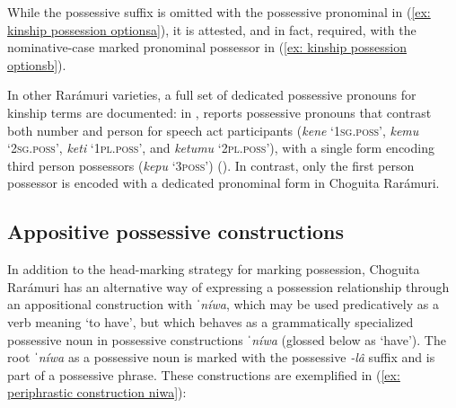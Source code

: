     \label{ex: kinship possession optionsa}
        \label{ex: kinship possession optionsb}
    \z
\z

While the possessive suffix is omitted with the possessive pronominal in (\ref{ex: kinship possession optionsa}), it is attested, and in fact, required, with the nominative-case marked pronominal possessor in (\ref{ex: kinship possession optionsb}).

In other Rarámuri varieties, a full set of dedicated possessive pronouns for kinship terms are documented: in , \citet{brambila1976diccionario} reports possessive pronouns that contrast both number and person for speech act participants (\textit{kene} `1\textsc{sg.poss}', \textit{kemu} `2\textsc{sg.poss}', \textit{keti} `1\textsc{pl.poss}', and \textit{ketumu} `2\textsc{pl.poss}'), with a single form encoding third person possessors (\textit{kepu} `3\textsc{poss}') (\citeyear[246--248]{brambila1976diccionario}). In contrast, only the first person possessor is encoded with a dedicated pronominal form in Choguita Rarámuri.

\subsection{Appositive possessive constructions}
\label{subsubsec: appositive possessive constructions}

In addition to the head-marking strategy for marking possession, Choguita Rarámuri has an alternative way of expressing a possession relationship through an appositional construction with \textit{ˈníwa}, which may be used predicatively as a verb meaning `to have', but which behaves as a grammatically specialized possessive noun in possessive constructions \textit{ˈníwa} (glossed below as `have'). The root \textit{ˈníwa} as a possessive noun is marked with the possessive \textit{-lâ} suffix and is part of a possessive phrase. These constructions are exemplified in (\ref{ex: periphrastic construction niwa}):

